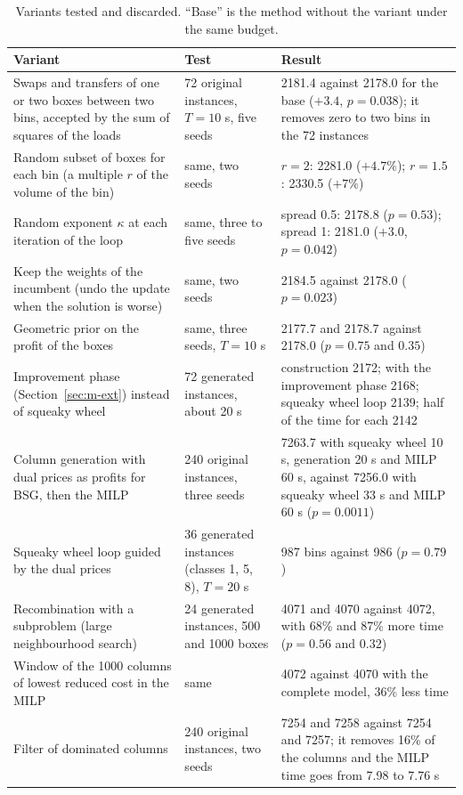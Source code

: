 \begin{table}[t]
\centering
\small\setlength{\tabcolsep}{4pt}
\caption{Variants tested and discarded. ``Base'' is the method without the variant under the same budget.}
\label{tab:e-negative}
\begin{tabular}{@{}p{3.7cm}p{4.0cm}p{7.2cm}@{}}
\toprule
Variant & Test & Result\\
\midrule
Swaps and transfers of one or two boxes between two bins, accepted by the sum of squares of the loads & 72 original instances, $T=10$ s, five seeds & 2181.4 against 2178.0 for the base ($+3.4$, $p=0.038$); it removes zero to two bins in the 72 instances\\
Random subset of boxes for each bin (a multiple $r$ of the volume of the bin) & same, two seeds & $r=2$: 2281.0 ($+4.7\%$); $r=1.5$: 2330.5 ($+7\%$)\\
Random exponent $\kappa$ at each iteration of the loop & same, three to five seeds & spread 0.5: 2178.8 ($p=0.53$); spread 1: 2181.0 ($+3.0$, $p=0.042$)\\
Keep the weights of the incumbent (undo the update when the solution is worse) & same, two seeds & 2184.5 against 2178.0 ($p=0.023$)\\
Geometric prior on the profit of the boxes & same, three seeds, $T=10$ s & 2177.7 and 2178.7 against 2178.0 ($p=0.75$ and $0.35$)\\
Improvement phase (Section~\ref{sec:m-ext}) instead of squeaky wheel & 72 generated instances, about 20 s & construction 2172; with the improvement phase 2168; squeaky wheel loop 2139; half of the time for each 2142\\
Column generation with dual prices as profits for BSG, then the MILP & 240 original instances, three seeds & 7263.7 with squeaky wheel 10 s, generation 20 s and MILP 60 s, against 7256.0 with squeaky wheel 33 s and MILP 60 s ($p=0.0011$)\\
Squeaky wheel loop guided by the dual prices & 36 generated instances (classes 1, 5, 8), $T=20$ s & 987 bins against 986 ($p=0.79$)\\
Recombination with a subproblem (large neighbourhood search) & 24 generated instances, 500 and 1000 boxes & 4071 and 4070 against 4072, with 68\% and 87\% more time ($p=0.56$ and $0.32$)\\
Window of the 1000 columns of lowest reduced cost in the MILP & same & 4072 against 4070 with the complete model, 36\% less time\\
Filter of dominated columns & 240 original instances, two seeds & 7254 and 7258 against 7254 and 7257; it removes 16\% of the columns and the MILP time goes from 7.98 to 7.76 s\\

\end{tabular}
\end{table}
